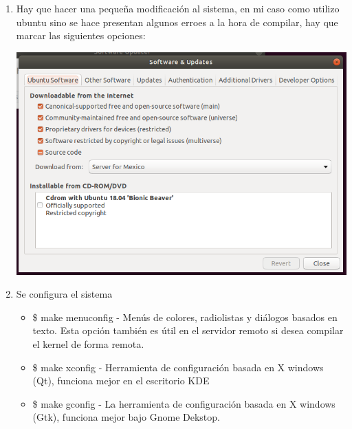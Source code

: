 \documentclass[a4paper, 11pt, oneside]{article}
\begin{document}
\begin{enumerate}
    \item Hay que hacer una pequeña modificación al sistema, en mi caso como utilizo ubuntu sino se hace presentan algunos erroes a la hora de compilar, hay que marcar las siguientes opciones:
    \begin{center}
        \includegraphics[scale=0.40]{modif.png}
    \end{center}
    \item Se configura el sistema
    \begin{itemize}
        \item \$ make menuconfig - Menús de colores, radiolistas y diálogos basados en texto. Esta opción también es útil en el servidor remoto si desea compilar el kernel de forma remota.
        \item \$ make xconfig - Herramienta de configuración basada en X windows (Qt), funciona mejor en el escritorio KDE
        \item \$ make gconfig - La herramienta de configuración basada en X windows (Gtk), funciona mejor bajo Gnome Dekstop.
        

\end{itemize}
\end{enumerate}
\end{document}

